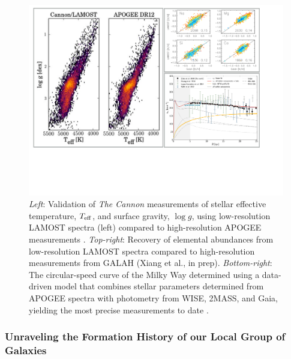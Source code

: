 \documentclass[oneside,11pt]{amsart}
\begin{document}
\begin{figure}[h!]
%
\vskip -0.1in
%
\includegraphics[width=\textwidth]{figs/LGplots} %
%
\caption{{\it Left}: Validation of {\it The Cannon} measurements of
stellar effective temperature, $T_{\rm eff}$, and surface gravity, $\log
g$, using low-resolution LAMOST spectra (left) compared to
high-resolution APOGEE measurements
\citep[right;][]{2017ApJ...836....5H}. {\it Top-right}: Recovery of
elemental abundances from low-resolution LAMOST spectra compared to
high-resolution measurements from GALAH (Xiang et al., in prep).  {\it
Bottom-right}: The circular-speed curve of the Milky Way determined
using a data-driven model that combines stellar parameters determined
from APOGEE spectra with photometry from WISE, 2MASS, and Gaia, yielding
the most precise measurements to date \citep{2019ApJ...871..120E}.}
%
\label{fig:Cannon}
%
\end{figure}

\subsubsection{Unraveling the Formation History of our Local Group of Galaxies}
\label{sec:localgroup}
~\medskip
\end{document}
